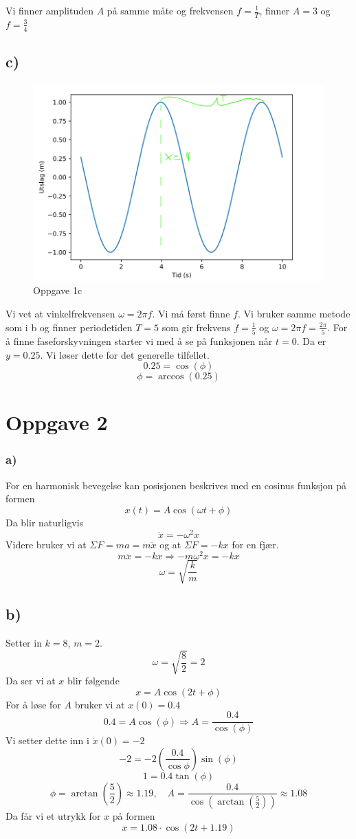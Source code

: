 \documentclass{article}
\begin{document}
Vi finner amplituden $A$ på samme måte og frekvensen $f = \frac{1}{T}$, finner $A = 3$ og $f = \frac{3}{4}$ 

\subsection*{c)}
\begin{figure}[h!]
    \centering
    \includegraphics[scale = .5]{Figures/1.c.png}
    \caption{Oppgave 1c}
    \label{fig: 1c}
  \end{figure} 
  
Vi vet at vinkelfrekvensen $ω = 2πf$. Vi må først finne $f$. Vi bruker samme metode som i b og finner periodetiden $T = 5$ som gir frekvens $f = \frac{1}{5}$ og $ω = 2πf = \frac{2π}{5}$. For å finne faseforskyvningen starter vi med å se på funksjonen når $t = 0$. Da er $y = 0.25$. Vi løser dette for det generelle tilfellet. 
\[
0.25 = \cos(ϕ)
\]
\[
 ϕ = \arccos (0.25)
\]

\section*{Oppgave 2}
\subsubsection*{a)}
For en harmonisk bevegelse kan posisjonen beskrives med en cosinus funksjon på formen
\[
x (t) = A \cos(ωt + ϕ)
\]
Da blir naturligvis 
\[
\ddot{x} = -ω^{2}x
\]
Videre bruker vi at $ΣF = ma = m \ddot{x}$ og at $ΣF = -kx$ for en fjær. 
\[
m \ddot{x} = -kx ⇒ - mω^{2}x = -kx
\]
\[
ω = \sqrt{\frac{k}{m}}
\]


\subsection*{b)}
Setter in $k = 8$, $m = 2$. 
\[
ω = \sqrt{\frac{8}{2}} = 2
\]
Da ser vi at $x$ blir følgende
\[
x = A \cos(2t + ϕ)
\]
For å løse for $A$ bruker vi at $x(0) = 0.4$
\[
0.4 = A \cos(ϕ) ⇒ A = \frac{0.4}{\cos(ϕ)}
\]
Vi setter dette inn i $\dot{x}(0) = -2$
\[
-2 = -2 \left( \frac{0.4}{\cos ϕ} \right)  \sin(ϕ)
\]
\[
1 = 0.4 \tan(ϕ)
\]
\[
ϕ = \arctan \left( \frac{5}{2} \right)  ≈ 1.19  , \quad A = \frac{0.4}{\cos  \left( \arctan \left( \frac{5}{2} \right)  \right) } ≈ 1.08
\]
Da får vi et utrykk for $x$ på formen
\[
x = 1.08 ⋅  \cos(2t + 1.19)
\]
\end{document}
